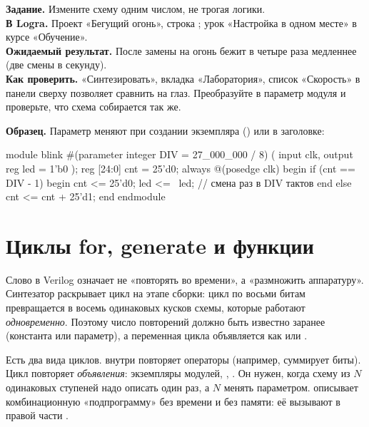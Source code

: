 \begin{diybox}
\textbf{Задание.} Измените схему одним числом, не трогая логики.\\
\textbf{В Logra.} Проект «Бегущий огонь», строка ; урок «Настройка в одном месте» в курсе «Обучение».\\
\textbf{Ожидаемый результат.} После замены  на  огонь бежит в четыре раза медленнее (две смены в секунду).\\
\textbf{Как проверить.} «Синтезировать», вкладка «Лаборатория», список «Скорость» в панели сверху позволяет сравнить на глаз.  Преобразуйте  в параметр модуля  и проверьте, что схема собирается так же.
\end{diybox}

\textbf{Образец.} Параметр  меняют при создании экземпляра
() или в заголовке:
\begin{vcode}
module blink #(parameter integer DIV = 27_000_000 / 8) (
    input      clk,
    output reg led = 1'b0
);
    reg [24:0] cnt = 25'd0;
    always @(posedge clk) begin
        if (cnt == DIV - 1) begin
            cnt <= 25'd0;
            led <= ~led;                // смена раз в DIV тактов
        end else cnt <= cnt + 25'd1;
    end
endmodule
\end{vcode}


\section{Циклы for, generate и функции}
\label{sec:v-loops}

Слово  в Verilog означает не «повторять во времени», а «размножить
аппаратуру». Синтезатор раскрывает цикл на этапе сборки: цикл по восьми битам
превращается в восемь одинаковых кусков схемы, которые работают
\emph{одновременно}. Поэтому число повторений должно быть известно заранее
(константа или параметр), а переменная цикла объявляется как 
или .

Есть два вида циклов.  внутри  повторяет операторы
(например, суммирует биты). Цикл  повторяет
\emph{объявления}: экземпляры модулей, , . Он нужен,
когда схему из $N$ одинаковых ступеней надо описать один раз, а $N$ менять
параметром.  описывает комбинационную «подпрограмму» без
времени и без памяти: её вызывают в правой части .

